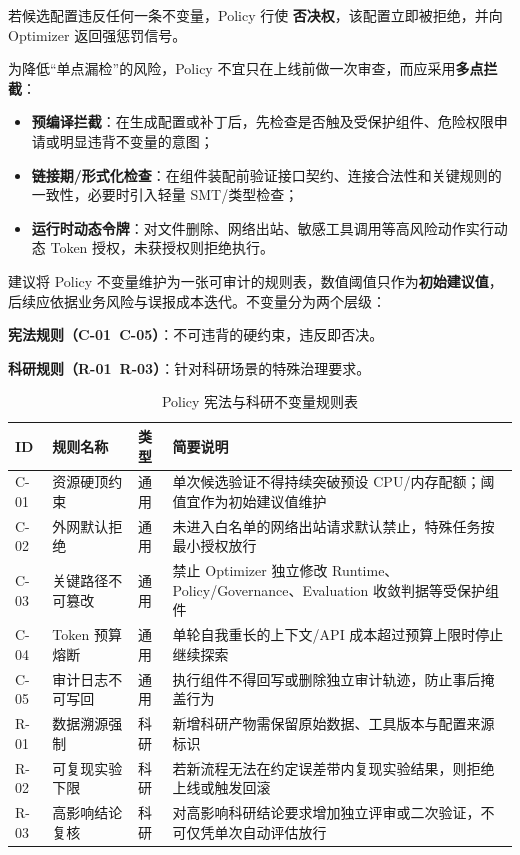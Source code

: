 若候选配置违反任何一条不变量，Policy 行使 \textbf{否决权}，该配置立即被拒绝，并向 Optimizer 返回强惩罚信号。

为降低“单点漏检”的风险，Policy 不宜只在上线前做一次审查，而应采用\textbf{多点拦截}：
\begin{itemize}
    \item \textbf{预编译拦截}：在生成配置或补丁后，先检查是否触及受保护组件、危险权限申请或明显违背不变量的意图；
    \item \textbf{链接期/形式化检查}：在组件装配前验证接口契约、连接合法性和关键规则的一致性，必要时引入轻量 SMT/类型检查；
    \item \textbf{运行时动态令牌}：对文件删除、网络出站、敏感工具调用等高风险动作实行动态 Token 授权，未获授权则拒绝执行。
\end{itemize}

建议将 Policy 不变量维护为一张可审计的规则表，数值阈值只作为\textbf{初始建议值}，后续应依据业务风险与误报成本迭代。不变量分为两个层级：

\textbf{宪法规则（C-01~C-05）}：不可违背的硬约束，违反即否决。

\textbf{科研规则（R-01~R-03）}：针对科研场景的特殊治理要求。

\begin{table}[htbp]
\centering
\caption{Policy 宪法与科研不变量规则表}
\label{tab:policy_invariants}
\begin{tabular}{p{1.6cm}p{3.2cm}p{1.8cm}p{7.0cm}}
\hline
\textbf{ID} & \textbf{规则名称} & \textbf{类型} & \textbf{简要说明} \\
\hline
C-01 & 资源硬顶约束 & 通用 & 单次候选验证不得持续突破预设 CPU/内存配额；阈值宜作为初始建议值维护 \\
C-02 & 外网默认拒绝 & 通用 & 未进入白名单的网络出站请求默认禁止，特殊任务按最小授权放行 \\
C-03 & 关键路径不可篡改 & 通用 & 禁止 Optimizer 独立修改 Runtime、Policy/Governance、Evaluation 收敛判据等受保护组件 \\
C-04 & Token 预算熔断 & 通用 & 单轮自我重长的上下文/API 成本超过预算上限时停止继续探索 \\
C-05 & 审计日志不可写回 & 通用 & 执行组件不得回写或删除独立审计轨迹，防止事后掩盖行为 \\
R-01 & 数据溯源强制 & 科研 & 新增科研产物需保留原始数据、工具版本与配置来源标识 \\
R-02 & 可复现实验下限 & 科研 & 若新流程无法在约定误差带内复现实验结果，则拒绝上线或触发回滚 \\
R-03 & 高影响结论复核 & 科研 & 对高影响科研结论要求增加独立评审或二次验证，不可仅凭单次自动评估放行 \\
\hline
\end{tabular}
\end{table}

